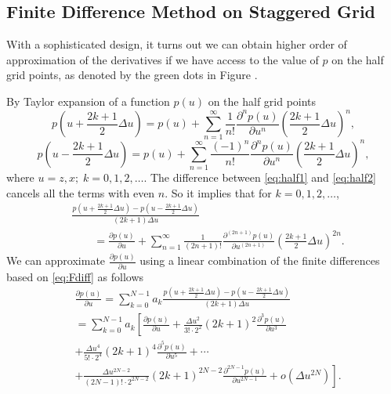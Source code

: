 \documentclass[11pt,titlepage]{article}
\theoremstyle{plain}
\theoremstyle{definition}
\theoremstyle{remark}
\numberwithin{equation}{section}
\begin{document}
\subsection{Finite Difference Method on Staggered Grid}
With a sophisticated design, it turns out we can obtain higher order of approximation of the derivatives if we have access to the value of $p$ on the half grid points, as denoted by the green dots in Figure .

By Taylor expansion of a function $p(u)$ on the half grid points
  \begin{equation}\label{eq:half1}
      p\left(u + \frac{2k+1}{2}\Delta u\right) = p(u) + \sum\limits_{n=1}^{\infty} \frac{1}{n!}     \frac{\partial^n p(u)}{\partial u^n}\left(\frac{2k+1}{2}\Delta u\right)^n, 
      \end{equation}
      \begin{equation}\label{eq:half2}
      p\left(u - \frac{2k+1}{2}\Delta u\right) = p(u) + \sum\limits_{n=1}^{\infty} \frac{(-1)^n}{n!}\frac{\partial^n p(u)}{\partial u^n}\left(\frac{2k+1}{2}\Delta u\right)^n,
  \end{equation}
where $u = z, x; \; k = 0, 1, 2, \dots $. The difference between \eqref{eq:half1} and \eqref{eq:half2} cancels all the terms with even $n$. So it implies that for $k = 0, 1, 2, \dots$,
\begin{equation}
\label{eq:Fdiff}
    \begin{aligned}
   &  \frac{p\left(u + \frac{2k+1}{2}\Delta u\right) - p\left(u - \frac{2k+1}{2}\Delta u\right)}{(2k+1)\Delta u}\\
    &~~~~~~~~~  =  \frac{\partial p(u)}{\partial u} + \sum\limits_{n=1 }^{\infty} \frac{1}{(2n+1)!}\frac{\partial^{(2n+1)} p(u)}{\partial u^{(2n+1)}}\left(\frac{2k+1}{2}\Delta u\right)^{2n}.
    \end{aligned}
    \end{equation}
We can approximate $\frac{\partial p(u)}{\partial u}$ using a linear combination of the finite differences based on \eqref{eq:Fdiff} as follows
  \begin{equation}
  \label{eq:weight}
  \begin{aligned}
    &\frac{\partial p(u)}{\partial u} = \sum\limits_{k=0}^{N-1} a_k \frac{p\left(u + \frac{2k+1}{2}\Delta u\right) - p\left(u - \frac{2k+1}{2}\Delta u\right)}{(2k+1)\Delta u}\\
    &= \sum\limits_{k=0}^{N-1} a_k \left[ \frac{\partial p(u)}{\partial u} + \frac{\Delta u^2}{3! \cdot 2^2}(2k+1)^2\frac{\partial^3 p(u)}{\partial u^3} \right.\\&\left. + \frac{\Delta u^4}{5! \cdot 2^4}(2k+1)^4\frac{\partial^5 p(u)}{\partial u^5} + \cdots \right.\\&\left. + \frac{\Delta u^{2N-2}}{(2N-1)! \cdot 2^{2N-2}}(2k+1)^{2N-2}\frac{\partial^{2N-1} p(u)}{\partial u^{2N-1}} + o(\Delta u^{2N}) \right].
  \end{aligned}
  \end{equation}
\end{document}
